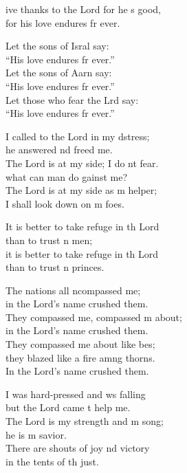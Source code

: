\settowidth{\versewidth}{I shall not die, I shall live and recount his deeds.}
\begin{psalmverse}[\versewidth]
  \begin{patverse}
    ive thanks to the Lord for he \pointup{\i}s good,\Med\\
    for his love endures fr ever.

    Let the sons of Isral say:\Med\\
    “His love endures fr ever.”\\
    Let the sons of Aarn say:\Med\\
    “His love endures fr ever.”\\
    Let those who fear the Lrd say:\Med\\
    “His love endures fr ever.”

    I called to the Lord in my d\pointup{\i}stress;\Med\\
    he answered nd freed me.\\
    The Lord is at my side; I do nt fear.\Med\\
    what can man do gainst me?\\
    The Lord is at my side as m helper;\Med\\
    I shall look down on m foes.

    It is better to take refuge in th Lord\Med\\
    than to trust \pointup{\i}n men;\\
    it is better to take refuge in th Lord\Med\\
    than to trust \pointup{\i}n princes.

    The nations all ncompassed me;\Med\\
    in the Lord’s name  crushed them.\\
    They compassed me, compassed m about;\Med\\
    in the Lord’s name  crushed them.\\
    They compassed me about like bes;\Flex\\
    they blazed like a fire amng thorns.\Med\\
    In the Lord’s name  crushed them.

    I was hard-pressed and ws falling\Med\\
    but the Lord came t help me.\\
    The Lord is my strength and m song;\Med\\
    he is m savior.\\
    There are shouts of joy nd victory\Med\\
    in the tents of th just.


\end{patverse}
\end{psalmverse}
